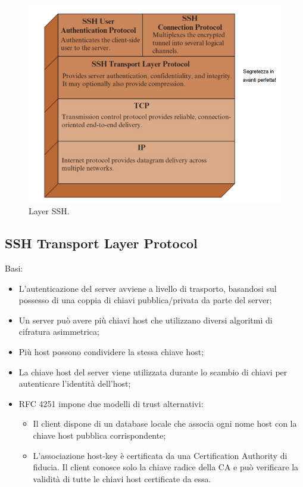 \begin{figure}
    \centering
    \includegraphics[width=1\textwidth]{images/chapter5/5-3.png}
    \caption{Layer SSH.}
    \label{fig:5-3}
\end{figure}

\subsection{SSH Transport Layer Protocol}

Basi:
\begin{itemize}
    \item L'autenticazione del server avviene a livello di trasporto, basandosi sul possesso di una coppia di chiavi pubblica/privata da parte del server;
	\item Un server può avere più chiavi host che utilizzano diversi algoritmi di cifratura asimmetrica;
	\item Più host possono condividere la stessa chiave host;
	\item La chiave host del server viene utilizzata durante lo scambio di chiavi per autenticare l'identità dell'host;
	\item RFC 4251 impone due modelli di trust alternativi:
	\begin{itemize}
	    \item Il client dispone di un database locale che associa ogni nome host con la chiave host pubblica corrispondente;
		\item L'associazione host-key è certificata da una Certification Authority di fiducia. Il client conosce solo la chiave radice della CA e può verificare la validità di tutte le chiavi host certificate da essa.
	\end{itemize}
\end{itemize}

